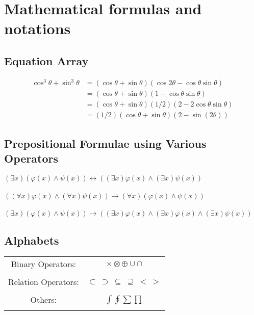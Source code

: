 \documentclass{article}
\begin{document}
\newpage

\section{Mathematical formulas and notations}
\subsection{Equation Array}

\begin{align}
    \cos^3 \theta + \sin^3 \theta &= (\cos \theta + \sin \theta)(\cos 2\theta - \cos \theta\sin \theta)\\
    &= (\cos \theta + \sin \theta)(1 - \cos \theta\sin \theta)\\
    &= (\cos \theta + \sin \theta)(1/2)(2-2\cos \theta\sin \theta)\\
    &= (1/2)(\cos \theta + \sin \theta)(2-\sin(2\theta))
\end{align}

\subsection{Prepositional Formulae using Various Operators}

\bigskip

$ \left ( \exists x \right )\left ( \varphi \left ( x \right ) \wedge \psi \left ( x \right ) \right )\longleftrightarrow \left ( \left ( \exists x \right ) \varphi \left ( x \right )\wedge\left ( \exists x \right )\psi\left ( x \right )\right )$\\\\
$ \left ( \left ( \forall x \right )\varphi \left ( x \right )\wedge\left ( \forall x\right ) \psi \left ( x \right ) \right ) \longrightarrow \left ( \forall x \right )\left ( \varphi \left ( x \right ) \wedge \psi \left ( x \right )\right )$\\\\
$ \left ( \exists x \right )\left ( \varphi\left ( x \right ) \wedge \psi \left ( x \right ) \right ) \longrightarrow \left ( \left ( \exists x \right )\varphi \left ( x \right )\wedge\left ( \exists x \right )\varphi \left ( x \right )\wedge\left ( \exists x \right )\psi \left ( x \right )\right )$

\subsection{Alphabets}
\begin{table}[h]
    \centering
    \begin{tabular}{|c|c|}
    \hline
        Binary Operators: & $ \times \otimes \oplus \cup \cap $ \\&\\
        \hline
        Relation Operators: &  $ \subset \: \supset \: \subseteq \: \supseteq \: < \: > $ \\&\\
        \hline
        Others: & $ \int \oint \sum \prod$\\&\\
        \hline
    \end{tabular}
\end{table}
\end{document}
